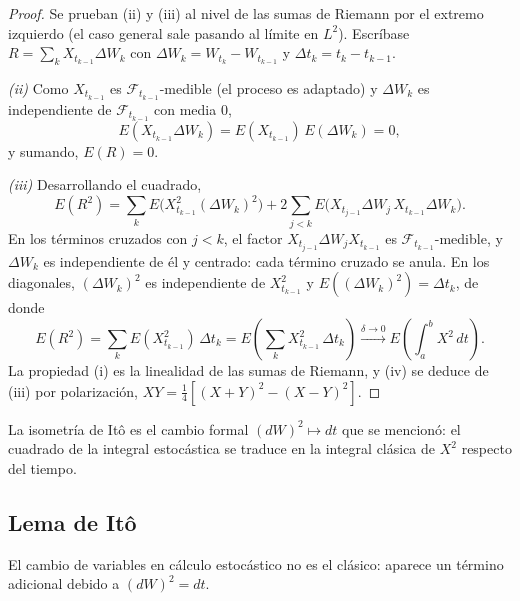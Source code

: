 \documentclass[11pt, a4paper]{article}
\begin{document}
\begin{proof}
Se prueban (ii) y (iii) al nivel de las sumas de Riemann por el extremo izquierdo (el caso
general sale pasando al límite en $L^2$). Escríbase $R = \sum_k X_{t_{k-1}} \Delta W_k$ con
$\Delta W_k = W_{t_k} - W_{t_{k-1}}$ y $\Delta t_k = t_k - t_{k-1}$.

\textit{(ii)} Como $X_{t_{k-1}}$ es $\mathcal{F}_{t_{k-1}}$-medible (el proceso es adaptado) y
$\Delta W_k$ es independiente de $\mathcal{F}_{t_{k-1}}$ con media $0$,
$$ E(X_{t_{k-1}} \Delta W_k) = E(X_{t_{k-1}}) \, E(\Delta W_k) = 0, $$
y sumando, $E(R) = 0$.

\textit{(iii)} Desarrollando el cuadrado,
$$ E(R^2) = \sum_k E\big(X_{t_{k-1}}^2 (\Delta W_k)^2\big) + 2 \sum_{j < k}
E\big(X_{t_{j-1}} \Delta W_j \, X_{t_{k-1}} \Delta W_k\big). $$
En los términos cruzados con $j < k$, el factor $X_{t_{j-1}} \Delta W_j X_{t_{k-1}}$ es
$\mathcal{F}_{t_{k-1}}$-medible, y $\Delta W_k$ es independiente de él y centrado: cada
término cruzado se anula. En los diagonales, $(\Delta W_k)^2$ es independiente de
$X_{t_{k-1}}^2$ y $E((\Delta W_k)^2) = \Delta t_k$, de donde
$$ E(R^2) = \sum_k E(X_{t_{k-1}}^2) \, \Delta t_k = E\!\left( \sum_k X_{t_{k-1}}^2 \, \Delta
t_k \right) \xrightarrow{\delta \to 0} E\!\left( \int_a^b X^2 \, dt \right). $$
La propiedad (i) es la linealidad de las sumas de Riemann, y (iv) se deduce de (iii) por
polarización, $XY = \tfrac{1}{4} \left[ (X + Y)^2 - (X - Y)^2 \right]$.
\end{proof}

\obs La isometría de Itô es el cambio formal $(dW)^2 \mapsto dt$ que se mencionó: el cuadrado
de la integral estocástica se traduce en la integral clásica de $X^2$ respecto del tiempo.

\subsection{Lema de Itô}

El cambio de variables en cálculo estocástico no es el clásico: aparece un término
adicional debido a $(dW)^2 = dt$.
\end{document}
